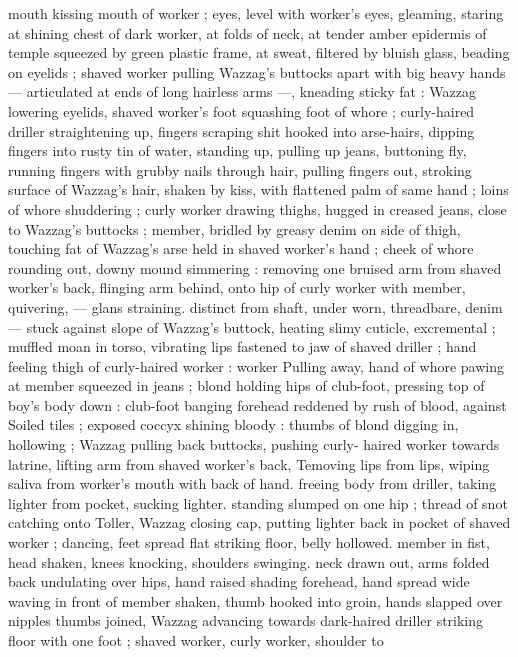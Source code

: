 mouth kissing mouth of worker ; eyes, level with worker's eyes, 
gleaming, staring at shining chest of dark worker, at folds of neck, at 
tender amber epidermis of temple squeezed by green plastic frame, 
at sweat, filtered by bluish glass, beading on eyelids ; shaved worker 
pulling Wazzag's buttocks apart with big heavy hands --- articulated 
at ends of long hairless arms ---, kneading sticky fat : Wazzag 
lowering eyelids, shaved worker's foot squashing foot of whore ; 
curly-haired driller straightening up, fingers scraping shit hooked 
into arse-hairs, dipping fingers into rusty tin of water, standing up, 
pulling up jeans, buttoning fly, running fingers with grubby nails 
through hair, pulling fingers out, stroking surface of Wazzag's hair, 
shaken by kiss, with flattened palm of same hand ; loins of whore 
shuddering ; curly worker drawing thighs, hugged in creased jeans, 
close to Wazzag's buttocks ; member, bridled by greasy denim on 
side of thigh, touching fat of Wazzag's arse held in shaved worker's 
hand ; cheek of whore rounding out, downy mound simmering : 
removing one bruised arm from shaved worker's back, flinging arm 
behind, onto hip of curly worker with member, quivering, --- glans 
straining. distinct from shaft, under worn, threadbare, denim --- 
stuck against slope of Wazzag's buttock, heating slimy cuticle, 
excremental ; muffled moan in torso, vibrating lips fastened to jaw of 
shaved driller ; hand feeling thigh of curly-haired worker : worker 
Pulling away, hand of whore pawing at member squeezed in jeans ; 
blond holding hips of club-foot, pressing top of boy's body down : 
club-foot banging forehead reddened by rush of blood, against 
Soiled tiles ; exposed coccyx shining bloody : thumbs of blond 
digging in, hollowing ; Wazzag pulling back buttocks, pushing curly- 
haired worker towards latrine, lifting arm from shaved worker's back, 
Temoving lips from lips, wiping saliva from worker's mouth with back 
of hand. freeing body from driller, taking lighter from pocket, sucking 
lighter. standing slumped on one hip ; thread of snot catching onto 
Toller, Wazzag closing cap, putting lighter back in pocket of shaved 
worker ; dancing, feet spread flat striking floor, belly hollowed. 
member in fist, head shaken, knees knocking, shoulders swinging. 
neck drawn out, arms folded back undulating over hips, hand raised 
shading forehead, hand spread wide waving in front of member 
shaken, thumb hooked into groin, hands slapped over nipples 
thumbs joined, Wazzag advancing towards dark-haired driller striking 
floor with one foot ; shaved worker, curly worker, shoulder to 
